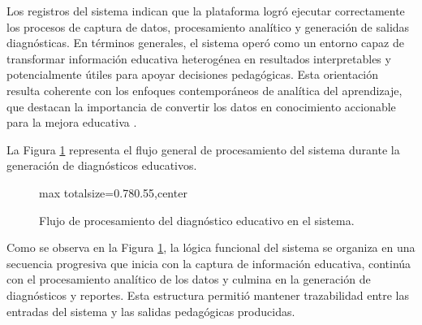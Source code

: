 \begin{refsection}
Los registros del sistema indican que la plataforma logró ejecutar correctamente los procesos de captura de datos, procesamiento analítico y generación de salidas diagnósticas. En términos generales, el sistema operó como un entorno capaz de transformar información educativa heterogénea en resultados interpretables y potencialmente útiles para apoyar decisiones pedagógicas. Esta orientación resulta coherente con los enfoques contemporáneos de analítica del aprendizaje, que destacan la importancia de convertir los datos en conocimiento accionable para la mejora educativa \parencite{siemenslong2011,greller2012,ferguson2012}.

La Figura \ref{fig:flujo-diagnostico} representa el flujo general de procesamiento del sistema durante la generación de diagnósticos educativos.

\begin{figure}[htbp]
\centering
\begin{adjustbox}{max totalsize={0.78\textwidth}{0.55\textheight},center}
\end{adjustbox}
\caption{Flujo de procesamiento del diagnóstico educativo en el sistema.}
\label{fig:flujo-diagnostico}
\end{figure}

Como se observa en la Figura \ref{fig:flujo-diagnostico}, la lógica funcional del sistema se organiza en una secuencia progresiva que inicia con la captura de información educativa, continúa con el procesamiento analítico de los datos y culmina en la generación de diagnósticos y reportes. Esta estructura permitió mantener trazabilidad entre las entradas del sistema y las salidas pedagógicas producidas.


\end{refsection}
